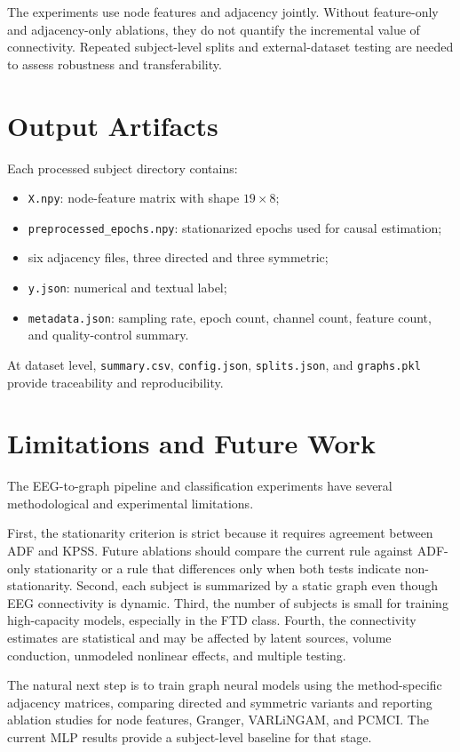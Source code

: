 \documentclass[11pt,a4paper]{article}
\begin{document}
The experiments use node features and adjacency jointly. Without feature-only
and adjacency-only ablations, they do not quantify the incremental value of
connectivity. Repeated subject-level splits and external-dataset testing are
needed to assess robustness and transferability.

\section{Output Artifacts}

Each processed subject directory contains:
\begin{itemize}
    \item \texttt{X.npy}: node-feature matrix with shape $19\times8$;
    \item \texttt{preprocessed\_epochs.npy}: stationarized epochs used for
          causal estimation;
    \item six adjacency files, three directed and three symmetric;
    \item \texttt{y.json}: numerical and textual label;
    \item \texttt{metadata.json}: sampling rate, epoch count, channel count,
          feature count, and quality-control summary.
\end{itemize}
At dataset level, \texttt{summary.csv}, \texttt{config.json},
\texttt{splits.json}, and \texttt{graphs.pkl} provide traceability and
reproducibility.

\section{Limitations and Future Work}

The EEG-to-graph pipeline and classification experiments have several
methodological and experimental limitations.

First, the stationarity criterion is strict because it requires agreement
between ADF and KPSS. Future ablations should compare the current rule against
ADF-only stationarity or a rule that differences only when both tests indicate
non-stationarity. Second, each subject is summarized by a static graph even
though EEG connectivity is dynamic. Third, the number of subjects is small for
training high-capacity models, especially in the FTD class. Fourth, the
connectivity estimates are statistical and may be affected by latent sources,
volume conduction, unmodeled nonlinear effects, and multiple testing.

The natural next step is to train graph neural models using the method-specific
adjacency matrices, comparing directed and symmetric variants and reporting
ablation studies for node features, Granger, VARLiNGAM, and PCMCI. The current
MLP results provide a subject-level baseline for that stage.
\end{document}
